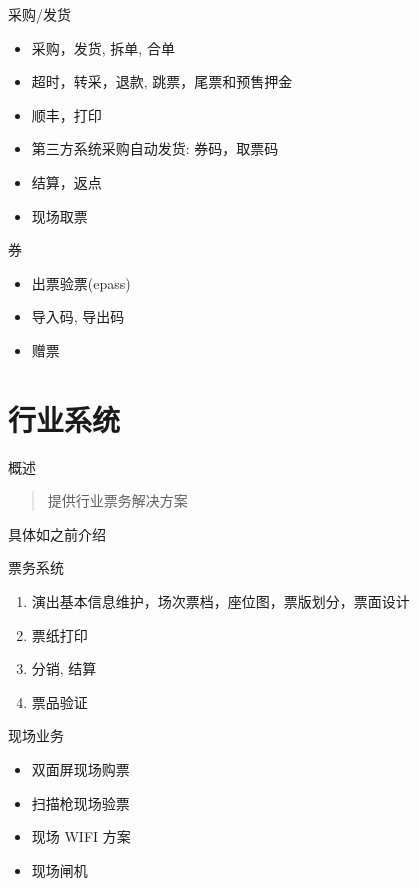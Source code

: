 \documentclass[presentation, bigger]{beamer}
\begin{document}
\begin{frame}[label={sec:org1076334}]{采购/发货}
\begin{itemize}
\item 采购，发货, 拆单, 合单
\item 超时，转采，退款, 跳票，尾票和预售押金
\item 顺丰，打印
\item 第三方系统采购自动发货: 券码，取票码
\item 结算，返点
\item 现场取票
\end{itemize}
\end{frame}

\begin{frame}[label={sec:orgbd709e7}]{券}
\begin{itemize}
\item 出票验票(epass)
\item 导入码, 导出码
\item 赠票
\end{itemize}
\end{frame}

\section{行业系统}
\label{sec:orge094fbb}
\begin{frame}[label={sec:org700d2c4}]{概述}
\begin{quote}
提供行业票务解决方案
\end{quote}

具体如之前介绍
\end{frame}

\begin{frame}[label={sec:org2e3e05b}]{票务系统}
\begin{enumerate}
\item 演出基本信息维护，场次票档，座位图，票版划分，票面设计
\item 票纸打印
\item 分销, 结算
\item 票品验证
\end{enumerate}
\end{frame}

\begin{frame}[label={sec:org908f8fd}]{现场业务}
\begin{itemize}
\item 双面屏现场购票
\item 扫描枪现场验票
\item 现场 WIFI 方案
\item 现场闸机
\end{itemize}
\end{frame}
\end{document}
